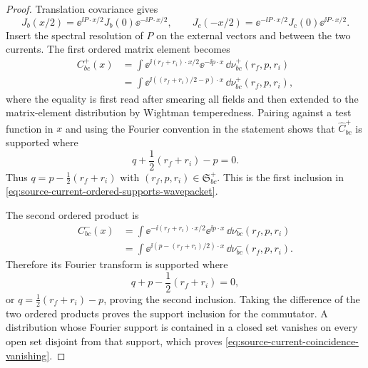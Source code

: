 \begin{proof}
Translation covariance gives
\[
  J_b(x/2)=\ee^{\ii P\cdot x/2}J_b(0)\ee^{-\ii P\cdot x/2},
  \qquad
  J_c(-x/2)=\ee^{-\ii P\cdot x/2}J_c(0)\ee^{\ii P\cdot x/2}.
\]
Insert the spectral resolution of \(P\) on the external vectors and between
the two currents.  The first ordered matrix element becomes
\begin{equation}
\begin{aligned}
  C^+_{bc}(x)
  &=
  \int
  \ee^{\ii(r_f+r_i)\cdot x/2}
  \ee^{-\ii p\cdot x}\,
  \dd\nu^+_{bc}(r_f,p,r_i)\\
  &=
  \int
  \ee^{\ii((r_f+r_i)/2-p)\cdot x}\,
  \dd\nu^+_{bc}(r_f,p,r_i),
\end{aligned}
  \label{eq:source-current-first-ordered-spectral-form}
\end{equation}
where the equality is first read after smearing all fields and then extended
to the matrix-element distribution by Wightman temperedness.  Pairing against
a test function in \(x\) and using the Fourier convention in the statement
shows that \(\widehat C^+_{bc}\) is supported where
\[
  q+\frac12(r_f+r_i)-p=0.
\]
Thus \(q=p-\frac12(r_f+r_i)\) with
\((r_f,p,r_i)\in\mathfrak S^+_{bc}\).  This is the first inclusion in
\eqref{eq:source-current-ordered-supports-wavepacket}.

The second ordered product is
\begin{equation}
\begin{aligned}
  C^-_{bc}(x)
  &=
  \int
  \ee^{-\ii(r_f+r_i)\cdot x/2}
  \ee^{\ii p\cdot x}\,
  \dd\nu^-_{bc}(r_f,p,r_i)\\
  &=
  \int
  \ee^{\ii(p-(r_f+r_i)/2)\cdot x}\,
  \dd\nu^-_{bc}(r_f,p,r_i).
\end{aligned}
  \label{eq:source-current-second-ordered-spectral-form}
\end{equation}
Therefore its Fourier transform is supported where
\[
  q+p-\frac12(r_f+r_i)=0,
\]
or \(q=\frac12(r_f+r_i)-p\), proving the second inclusion.  Taking the
difference of the two ordered products proves the support inclusion for the
commutator.  A distribution whose Fourier support is contained in a closed set
vanishes on every open set disjoint from that support, which proves
\eqref{eq:source-current-coincidence-vanishing}.
\end{proof}


